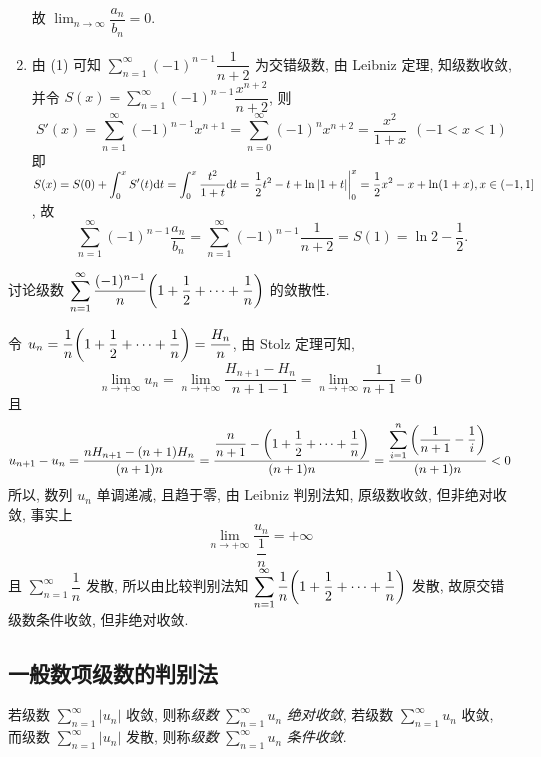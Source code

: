 \begin{solution}
\begin{enumerate}[label=(\arabic{*})]
              故 $\displaystyle\lim_{n\to\infty}\dfrac{a_n}{b_n}=0.$
        \item 由 (1) 可知 $\displaystyle\sum_{n=1}^{\infty}(-1)^{n-1}\dfrac{1}{n+2}$ 为交错级数, 由 Leibniz 定理, 知级数收敛, 并令 $S(x)=\displaystyle\sum_{n=1}^{\infty}(-1)^{n-1}\dfrac{x^{n+2}}{n+2}$, 则
              $$S'(x)=\sum_{n=1}^{\infty}(-1)^{n-1}x^{n+1}=\sum_{n=0}^{\infty}(-1)^nx^{n+2}=\dfrac{x^2}{1+x}~~(-1<x<1)$$
              即 $S(x)=S(0)+\displaystyle\int_{0}^{x}S'(t)\dd t=\int_{0}^{x}\dfrac{t^2}{1+t}\dd t=\eval{\dfrac{1}{2}t^2-t+\ln|1+t|}_{0}^{x}=\dfrac{1}{2}x^2-x+\ln(1+x),x\in(-1,1]$,
              故 $$\displaystyle\sum_{n=1}^{\infty}(-1)^{n-1}\dfrac{a_n}{b_n}=\sum_{n=1}^{\infty}(-1)^{n-1}\dfrac{1}{n+2}=S(1)=\ln 2-\dfrac{1}{2}.$$
    \end{enumerate}
\end{solution}

\begin{example}
    讨论级数 $\displaystyle \sum_{n=1}^{\infty} \dfrac{(-1)^{n-1}}{n}\qty(1+\dfrac{1}{2}+\cdots+\dfrac{1}{n})$ 的敛散性.
\end{example}
\begin{solution}
    令 $u_n=\dfrac{1}{n}\qty(1+\dfrac{1}{2}+\cdots+\dfrac{1}{n})=\dfrac{H_n}{n}$, 由 Stolz 定理可知,
    $$
        \lim_{n \to +\infty}u_n=\lim_{n \to +\infty}\dfrac{H_{n+1}-H_n}{n+1-1}=\lim_{n \to +\infty}\dfrac{1}{n+1}=0
    $$
    且
    $$
        u_{n+1}-u_n=\dfrac{nH_{n+1}-(n+1)H_n}{(n+1)n}=\dfrac{\dfrac{n}{n+1}-\qty(1+\dfrac{1}{2}+\cdots+\dfrac{1}{n})}{(n+1)n}=\dfrac{\displaystyle \sum_{i=1}^{n}\qty(\dfrac{1}{n+1}-\dfrac{1}{i})}{(n+1)n}<0
    $$
    所以, 数列 $u_n$ 单调递减, 且趋于零, 由 Leibniz 判别法知, 原级数收敛, 但非绝对收敛, 事实上
    $$
        \lim_{n \to +\infty}\dfrac{u_n}{\dfrac{1}{n}}=+\infty
    $$
    且 $\displaystyle \sum_{n=1}^{\infty} \dfrac{1}{n}$ 发散, 所以由比较判别法知 $ \displaystyle \sum_{n=1}^{\infty} \dfrac{1}{n}\qty(1+\dfrac{1}{2}+\cdots+\dfrac{1}{n}) $ 发散, 故原交错级数条件收敛, 但非绝对收敛.
\end{solution}

\subsection{一般数项级数的判别法}

\begin{definition}[绝对收敛与条件收敛]
    若级数 $\displaystyle \sum_{n=1}^{\infty}\left|u_{n}\right| $ 收敛, 则称\textit{级数} $\displaystyle \sum_{n=1}^{\infty} u_{n} $ \textit{绝对收敛},
    若级数 $\displaystyle \sum_{n=1}^{\infty} u_{n} $ 收敛, 而级数 $\displaystyle  \sum_{n=1}^{\infty}\left|u_{n}\right| $ 发散, 则称\textit{级数} $\displaystyle \sum_{n=1}^{\infty} u_{n} $ \textit{条件收敛}.
\end{definition}

